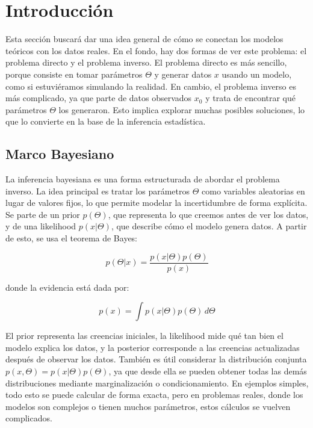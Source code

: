 \section{Introducción}

Esta sección buscará dar una idea general de cómo se conectan los modelos teóricos con los datos reales. En el fondo, hay dos formas de ver este problema: el problema directo y el problema inverso. El problema directo es más sencillo, porque consiste en tomar parámetros $\Theta$ y generar datos $x$ usando un modelo, como si estuviéramos simulando la realidad. En cambio, el problema inverso es más complicado, ya que parte de datos observados $x_0$ y trata de encontrar qué parámetros $\Theta$ los generaron. Esto implica explorar muchas posibles soluciones, lo que lo convierte en la base de la inferencia estadística.

\subsection{Marco Bayesiano}

La inferencia bayesiana es una forma estructurada de abordar el problema inverso. La idea principal es tratar los parámetros $\Theta$ como variables aleatorias en lugar de valores fijos, lo que permite modelar la incertidumbre de forma explícita. Se parte de un prior $p(\Theta)$, que representa lo que creemos antes de ver los datos, y de una likelihood $p(x|\Theta)$, que describe cómo el modelo genera datos. A partir de esto, se usa el teorema de Bayes:

\begin{equation}
p(\Theta|x) = \frac{p(x|\Theta)p(\Theta)}{p(x)}
\end{equation}

donde la evidencia está dada por:

\begin{equation}
p(x) = \int p(x|\Theta)p(\Theta)\, d\Theta
\end{equation}

El prior representa las creencias iniciales, la likelihood mide qué tan bien el modelo explica los datos, y la posterior corresponde a las creencias actualizadas después de observar los datos. También es útil considerar la distribución conjunta $p(x, \Theta) = p(x|\Theta)p(\Theta)$, ya que desde ella se pueden obtener todas las demás distribuciones mediante marginalización o condicionamiento. En ejemplos simples, todo esto se puede calcular de forma exacta, pero en problemas reales, donde los modelos son complejos o tienen muchos parámetros, estos cálculos se vuelven complicados.

